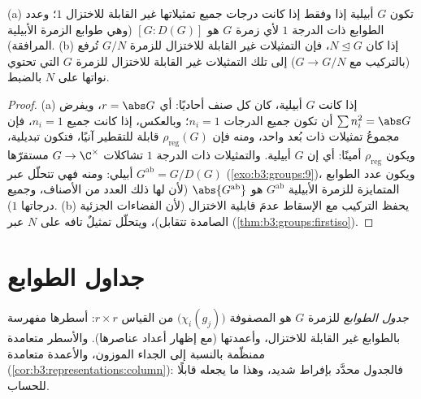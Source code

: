\begin{proposition}
\label{prop:b3:representations:onedim}
(a) تكون $G$ أبيلية إذا وفقط إذا كانت درجات جميع تمثيلاتها غير
القابلة للاختزال $1$؛ وعدد الطوابع ذات الدرجة $1$ لأي زمرة $G$
هو $[G : D(G)]$ (وهي طوابع الزمرة الأبيلية المرافقة).
(b) إذا كان $N \trianglelefteq G$، فإن التمثيلات غير القابلة للاختزال للزمرة
$G/N$ تُرفع (بالتركيب مع $G \to G/N$) إلى تلك التمثيلات غير
القابلة للاختزال للزمرة $G$ التي تحتوي نواتها على $N$ بالضبط.
\end{proposition}

\begin{proof}
(a) إذا كانت $G$ أبيلية، كان كل صنف أحاديًا: أي $r = \abs G$،
ويفرض $\sum n_i^2 = \abs G$ أن تكون جميع الدرجات $n_i = 1$؛ وبالعكس، إذا كانت
جميع $n_i = 1$، فإن  مجموعُ تمثيلات ذات بُعد واحد،
ومنه فإن $\rho_{\mathrm{reg}}(G)$ قابلة للتقطير آنيًا، فتكون تبديلية، ويكون $\rho_{\mathrm{reg}}$
أمينًا: أي إن $G$ أبيلية. والتمثيلات ذات الدرجة $1$ تشاكلات
$G \to \C^\times$ مستقرّها أبيلي: ومنه فهي تتحلّل عبر $G^{\mathrm{ab}} = G/D(G)$
(\cref{exo:b3:groups:9})، ويكون عدد الطوابع المتمايزة للزمرة الأبيلية
$G^{\mathrm{ab}}$ هو $\abs{G^{\mathrm{ab}}}$ (لأن لها ذلك العدد من الأصناف، وجميع درجاتها
$1$). (b) يحفظ التركيب مع الإسقاط عدمَ قابلية الاختزال (لأن
الفضاءات الجزئية الصامدة تتقابل)، ويتحلّل تمثيلٌ تافه على $N$ عبر
 (\cref{thm:b3:groups:firstiso}).
\end{proof}

\section{جداول الطوابع}

\begin{definition}\label{def:b3:representations:table}
\emph{جدول الطوابع} للزمرة $G$ هو المصفوفة
$\bigl(\chi_i(g_j)\bigr)$ من القياس $r \times r$: أسطرها مفهرسة بالطوابع غير
القابلة للاختزال، وأعمدتها  (مع إظهار أعداد
عناصرها). والأسطر متعامدة ممنظّمة بالنسبة إلى الجداء الموزون،
والأعمدة متعامدة (\cref{cor:b3:representations:column}): فالجدول محدَّد بإفراط شديد،
وهذا ما يجعله قابلًا للحساب.
\end{definition}

